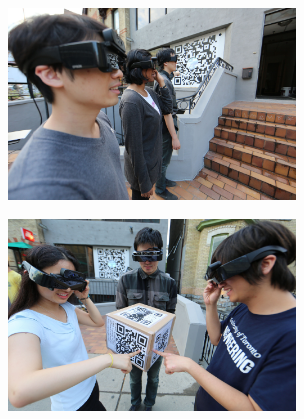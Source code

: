 \begin{figure}
        \centering
        \begin{subfigure}[b]{0.5\textwidth}
                \centering
\includegraphics[height=2in]{ch5/figs/wearable/low_res/3_eyetap_qr_line_IMG_2232.jpg} 
                \caption{}
                \label{fig:qr_wall}
        \end{subfigure}%
        \begin{subfigure}[b]{0.5\textwidth}
                \centering
		\includegraphics[height=2in]{ch5/figs/wearable/low_res/3_eyeglass_3_IMG_2303.jpg} 
               \caption{}
                \label{fig:qr_cube}
        \end{subfigure}
        

\end{figure}
